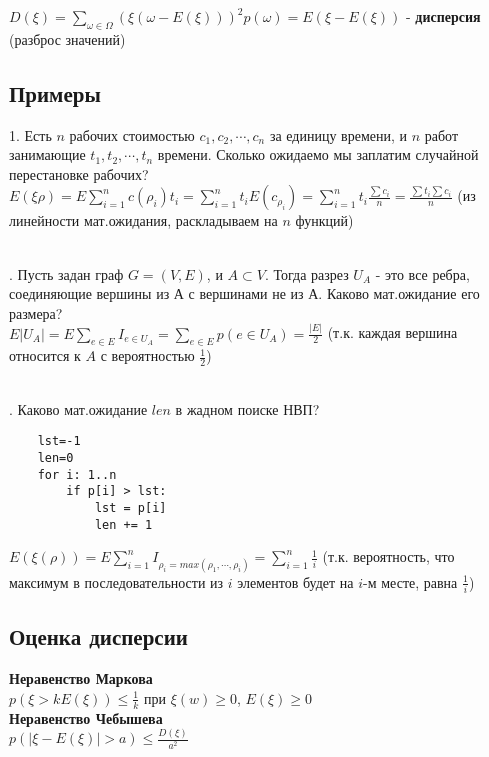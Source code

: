 \documentclass[a4paper,12pt]{article}
\begin{document}
	\noindent $D(\xi)=\sum\limits_{\omega \in \Omega}(\xi(\omega-E(\xi)))^2p(\omega)=E(\xi-E(\xi))$ - \textbf{дисперсия} (разброс значений)

	\subsection*{Примеры}
	1. Есть $n$ рабочих стоимостью $c_1, c_2, \cdots, c_n$ за единицу времени, и $n$ работ занимающие $t_1, t_2, \cdots, t_n$ времени. Сколько ожидаемо мы заплатим случайной перестановке рабочих? \\
	$E(\xi \rho)=E\sum\limits_{i=1}^n c(\rho_i)t_i=\sum\limits_{i=1}^n t_i E(c_{\rho_i})=\sum\limits_{i=1}^n t_i \frac{\sum c_i}{n}=\frac{\sum t_i\sum c_i}{n}$ (из линейности мат.ожидания, раскладываем на $n$ функций) \\
	~\

	. Пусть задан граф $G=(V,E)$, и $A \subset V$. Тогда разрез $U_A$ - это все ребра, соединяющие вершины из А с вершинами не из А. Каково мат.ожидание его размера?\\
	$E|U_A|=E\sum\limits_{e \in E} I_{e \in U_A}=\sum\limits_{e \in E}p(e \in U_A)=\frac{|E|}{2}$ (т.к. каждая вершина относится к $A$ с вероятностью $\frac{1}{2}$)\\
	~\

	. Каково мат.ожидание $len$ в жадном поиске НВП?\\
	\begin{lstlisting}
	lst=-1
	len=0
	for i: 1..n
	    if p[i] > lst:
	    	lst = p[i]
	    	len += 1
	\end{lstlisting}

	\noindent $E(\xi(\rho))=E\sum\limits_{i=1}^n I_{\rho_i=max(\rho_1, \cdots, \rho_i)}=\sum\limits_{i=1}^n \frac{1}{i}$ (т.к. вероятность, что максимум в
	последовательности из $i$ элементов будет на $i$-м месте, равна $\frac{1}{i}$)

	\subsection*{Оценка дисперсии}
	\textbf{Неравенство Маркова}\\
	$p(\xi>kE(\xi)) \le \frac{1}{k}$ при $\xi(w) \ge 0$, $E(\xi) \ge 0$\\

	\noindent \textbf{Неравенство Чебышева}\\
	\noindent $p(|\xi-E(\xi)|>a) \le \frac{D(\xi)}{a^2}$
\end{document}
